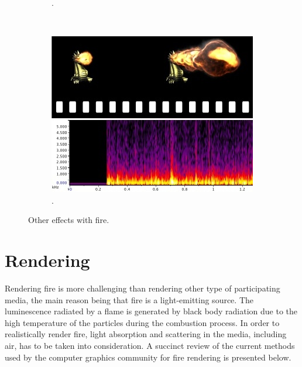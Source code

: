 \begin{figure}[htpb!]
\begin{subfigure}[t]{0.4\textwidth}
                \caption{\cite{Melek:2005}.}
        \end{subfigure}  
        ~ %
        \begin{subfigure}[t]{0.3\textwidth}
                \includegraphics[width=\textwidth]{img/chadwick_2011}
                \caption{\cite{Chadwick:2011}.}
        \end{subfigure}          
        \caption{Other effects with fire.}
        \label{fig:other_effects}
\end{figure}



\section{Rendering}
\label{sec:rendering}

Rendering fire is more challenging than rendering other type of participating media, the main reason being that fire is a light-emitting source.
The luminescence radiated by a flame is generated by black body radiation due to the high temperature of the particles during the combustion process.
In order to realistically render fire, light absorption and scattering in the media, including air, has to be taken into consideration.
A succinct review of the current methods used by the computer graphics community for fire rendering is presented below.

